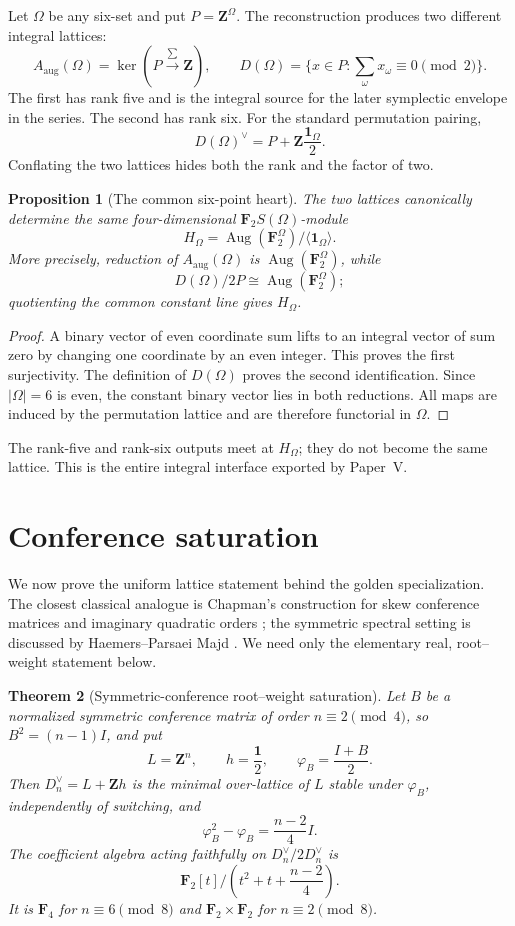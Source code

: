 \documentclass[11pt]{article}
\newtheorem{theorem}{Theorem}[section]
\newtheorem{proposition}[theorem]{Proposition}
\theoremstyle{definition}
\theoremstyle{remark}
\newcommand{\F}{\mathbf F}
\newcommand{\Z}{\mathbf Z}
\newcommand{\Aug}{\operatorname{Aug}}
\begin{document}
Let \(\Omega\) be any six-set and put \(P=\Z^\Omega\).  The reconstruction
produces two different integral lattices:
\[
 A_{\mathrm{aug}}(\Omega)=\ker(P\xrightarrow{\sum}\Z),
 \qquad
 D(\Omega)=\{x\in P:\textstyle\sum_\omega x_\omega\equiv0\pmod2\}.
\]
The first has rank five and is the integral source for the later symplectic
envelope in the series.  The second has rank six.  For the standard
permutation pairing,
\[
                  D(\Omega)^\vee=P+\Z\frac{\mathbf1_\Omega}{2}.
\]
Conflating the two lattices hides both the rank and the factor of two.

\begin{proposition}[The common six-point heart]
\label{prop:common-heart}
The two lattices canonically determine the same four-dimensional
\(\F_2S(\Omega)\)-module
\[
 H_\Omega=\Aug(\F_2^\Omega)/\langle\mathbf1_\Omega\rangle.
\]
More precisely, reduction of \(A_{\mathrm{aug}}(\Omega)\) is
\(\Aug(\F_2^\Omega)\), while
\[
 D(\Omega)/2P\cong\Aug(\F_2^\Omega);
\]
quotienting the common constant line gives \(H_\Omega\).
\end{proposition}

\begin{proof}
A binary vector of even coordinate sum lifts to an integral vector of sum
zero by changing one coordinate by an even integer.  This proves the first
surjectivity.  The definition of \(D(\Omega)\) proves the second
identification.  Since \(|\Omega|=6\) is even, the constant binary vector lies
in both reductions.  All maps are induced by the permutation lattice and
are therefore functorial in \(\Omega\).
\end{proof}

The rank-five and rank-six outputs meet at \(H_\Omega\); they do not become
the same lattice.  This is the entire integral interface exported by Paper~V.

\section{Conference saturation}
\label{sec:conference-saturation}

We now prove the uniform lattice statement behind the golden specialization.
The closest classical analogue is Chapman's construction for skew conference
matrices and imaginary quadratic orders \cite{Chapman2001}; the symmetric
spectral setting is discussed by Haemers--Parsaei Majd
\cite{HaemersParsaeiMajd2022}.  We need only the elementary real,
root--weight statement below.

\begin{theorem}[Symmetric-conference root--weight saturation]
\label{thm:conference-saturation}
Let \(B\) be a normalized symmetric conference matrix of order
\(n\equiv2\pmod4\), so \(B^2=(n-1)I\), and put
\[
 L=\Z^n,\qquad h=\frac{\mathbf1}{2},\qquad
 \varphi_B=\frac{I+B}{2}.
\]
Then \(D_n^\vee=L+\Z h\) is the minimal over-lattice of \(L\) stable under
\(\varphi_B\), independently of switching, and
\[
              \varphi_B^2-\varphi_B=\frac{n-2}{4}I.
\]
The coefficient algebra acting faithfully on \(D_n^\vee/2D_n^\vee\) is
\[
 \F_2[t]\big/\left(t^2+t+\frac{n-2}{4}\right).
\]
It is \(\F_4\) for \(n\equiv6\pmod8\) and
\(\F_2\times\F_2\) for \(n\equiv2\pmod8\).
\end{theorem}
\end{document}
